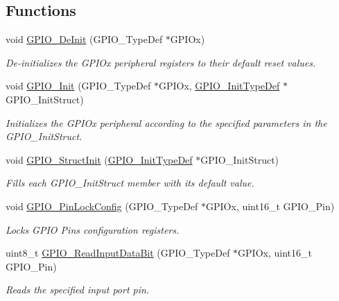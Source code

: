 \subsection*{Functions}
\begin{DoxyCompactItemize}
\item 
void \mbox{\hyperlink{group___g_p_i_o_gaa60bdf3182c44b5fa818f237042f52ee}{G\+P\+I\+O\+\_\+\+De\+Init}} (G\+P\+I\+O\+\_\+\+Type\+Def $\ast$G\+P\+I\+Ox)
\begin{DoxyCompactList}\small\item\em De-\/initializes the G\+P\+I\+Ox peripheral registers to their default reset values. \end{DoxyCompactList}\item 
void \mbox{\hyperlink{group___g_p_i_o_ga71abf9404261370d03cca449b88d3a65}{G\+P\+I\+O\+\_\+\+Init}} (G\+P\+I\+O\+\_\+\+Type\+Def $\ast$G\+P\+I\+Ox, \mbox{\hyperlink{struct_g_p_i_o___init_type_def}{G\+P\+I\+O\+\_\+\+Init\+Type\+Def}} $\ast$G\+P\+I\+O\+\_\+\+Init\+Struct)
\begin{DoxyCompactList}\small\item\em Initializes the G\+P\+I\+Ox peripheral according to the specified parameters in the G\+P\+I\+O\+\_\+\+Init\+Struct. \end{DoxyCompactList}\item 
void \mbox{\hyperlink{group___g_p_i_o_gab28de41278e7f8c63d0851e2733b10df}{G\+P\+I\+O\+\_\+\+Struct\+Init}} (\mbox{\hyperlink{struct_g_p_i_o___init_type_def}{G\+P\+I\+O\+\_\+\+Init\+Type\+Def}} $\ast$G\+P\+I\+O\+\_\+\+Init\+Struct)
\begin{DoxyCompactList}\small\item\em Fills each G\+P\+I\+O\+\_\+\+Init\+Struct member with its default value. \end{DoxyCompactList}\item 
void \mbox{\hyperlink{group___g_p_i_o_gad2f2e615928c69fd0d8c641a7cedaafc}{G\+P\+I\+O\+\_\+\+Pin\+Lock\+Config}} (G\+P\+I\+O\+\_\+\+Type\+Def $\ast$G\+P\+I\+Ox, uint16\+\_\+t G\+P\+I\+O\+\_\+\+Pin)
\begin{DoxyCompactList}\small\item\em Locks G\+P\+IO Pins configuration registers. \end{DoxyCompactList}\item 
uint8\+\_\+t \mbox{\hyperlink{group___g_p_i_o_ga98772ef6b639b3fa06c8ae5ba28d3aaa}{G\+P\+I\+O\+\_\+\+Read\+Input\+Data\+Bit}} (G\+P\+I\+O\+\_\+\+Type\+Def $\ast$G\+P\+I\+Ox, uint16\+\_\+t G\+P\+I\+O\+\_\+\+Pin)
\begin{DoxyCompactList}\small\item\em Reads the specified input port pin. \end{DoxyCompactList}\item 

\end{DoxyCompactItemize}
